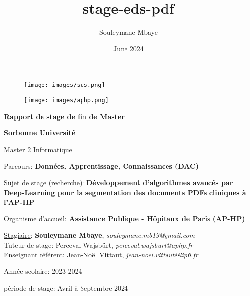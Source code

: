 \documentclass{report}
\title{stage-eds-pdf}
\author{Souleymane Mbaye}
\date{June 2024}
\begin{document}
\thispagestyle{empty}

\begin{figure}[h]
    \begin{minipage}[t]{0.2\textwidth}
        \flushleft
        \texttt{[image: images/sus.png]}
    \end{minipage}
    \hfill
    \begin{minipage}[t]{0.4\textwidth}
        \flushright
        \texttt{[image: images/aphp.png]}
    \end{minipage}
\end{figure}


\begin{center}

    \huge
    \vspace{1cm}
    \textbf{Rapport de stage de fin de Master}
    
    \large
    \vspace{2cm}
    \textbf{Sorbonne Université}
    
    \vspace{0.2cm}
    Master 2 Informatique
    
    \vspace{1cm}
    \uline{Parcours}: \textbf{Données, Apprentissage, Connaissances (DAC)}
    
    \Large
    \vspace{2cm}
    \uline{Sujet de stage (recherche)}: \textbf{Développement d'algorithmes avancés par Deep-Learning pour la segmentation des documents PDFs cliniques à l'AP-HP}
    
    \Large
    \vspace{2cm}
    \uline{Organisme d’accueil}: \textbf{Assistance Publique - Hôpitaux de Paris (AP-HP)}

    
    
    \Large
    \vspace{2cm}
    \uline{Stagiaire}: \textbf{Souleymane Mbaye}, \textit{souleymane.mb19@gmail.com} \\
    Tuteur de stage: Perceval Wajsbürt, \textit{perceval.wajsburt@aphp.fr} \\
    Enseignant référent: Jean-Noël Vittaut, \textit{jean-noel.vittaut@lip6.fr}

\end{center}

\vspace{3cm}
\noindent
\begin{minipage}[t]{0.4\textwidth}
    \flushleft
    Année scolaire: 2023-2024
\end{minipage}%
\begin{minipage}[t]{0.6\textwidth}
    \flushright
    période de stage: Avril à Septembre 2024
\end{minipage}
\end{document}
